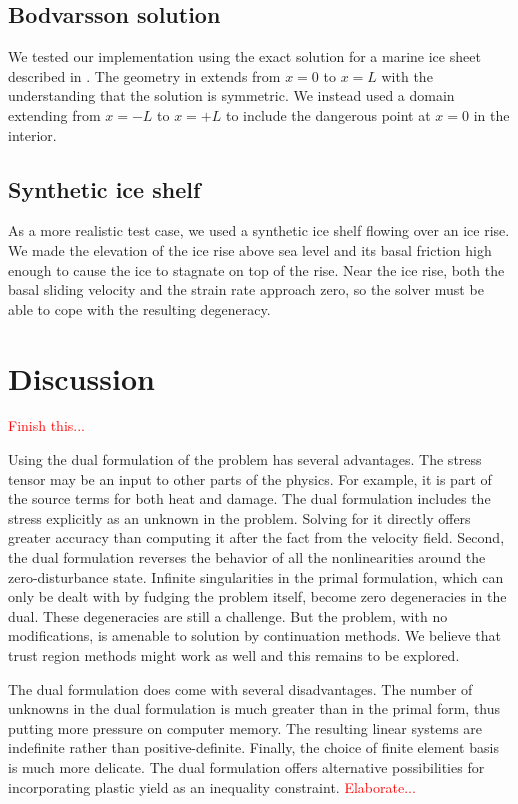 \documentclass{article}
\theoremstyle{definition}
\theoremstyle{plain}
\begin{document}
\subsection{Bodvarsson solution}

We tested our implementation using the exact solution for a marine ice sheet described in \citet{bueler2014exact}.
The geometry in \citet{bueler2014exact} extends from $x = 0$ to $x = L$ with the understanding that the solution is symmetric.
We instead used a domain extending from $x = -L$ to $x = +L$ to include the dangerous point at $x = 0$ in the interior.

\subsection{Synthetic ice shelf}

As a more realistic test case, we used a synthetic ice shelf flowing over an ice rise.
We made the elevation of the ice rise above sea level and its basal friction high enough to cause the ice to stagnate on top of the rise.
Near the ice rise, both the basal sliding velocity and the strain rate approach zero, so the solver must be able to cope with the resulting degeneracy.


\section{Discussion}

\textcolor{red}{Finish this...}

Using the dual formulation of the problem has several advantages.
The stress tensor may be an input to other parts of the physics.
For example, it is part of the source terms for both heat and damage.
The dual formulation includes the stress explicitly as an unknown in the problem.
Solving for it directly offers greater accuracy than computing it after the fact from the velocity field.
Second, the dual formulation reverses the behavior of all the nonlinearities around the zero-disturbance state.
Infinite singularities in the primal formulation, which can only be dealt with by fudging the problem itself, become zero degeneracies in the dual.
These degeneracies are still a challenge.
But the problem, with no modifications, is amenable to solution by continuation methods.
We believe that trust region methods might work as well and this remains to be explored.

The dual formulation does come with several disadvantages.
The number of unknowns in the dual formulation is much greater than in the primal form, thus putting more pressure on computer memory.
The resulting linear systems are indefinite rather than positive-definite.
Finally, the choice of finite element basis is much more delicate.
The dual formulation offers alternative possibilities for incorporating plastic yield as an inequality constraint.
\textcolor{red}{Elaborate...}
\end{document}
